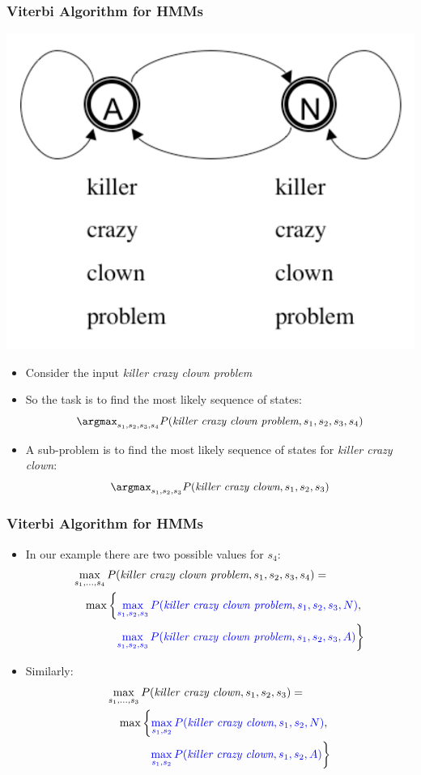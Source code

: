 \begin{frame}
\frametitle{Viterbi Algorithm for HMMs}
\begin{center}
\includegraphics[scale=.3]{figures/hmmfig}
\end{center}
\begin{itemize}[<+->]
\item Consider the input {\it killer crazy clown problem}
\item So the task is to find the most likely sequence of states:
\[ \argmax_{s_1, s_2, s_3, s_4} P(\textit{killer crazy clown problem}, s_1, s_2, s_3, s_4) \]
\item A sub-problem is to find the most likely sequence of states for {\it killer crazy clown}:
\[ \argmax_{s_1, s_2, s_3} P(\textit{killer crazy clown}, s_1, s_2, s_3) \]
\end{itemize}
\end{frame}

\begin{frame}
\frametitle{Viterbi Algorithm for HMMs}
\begin{itemize}[<+->]
\item In our example there are two possible values for $s_4$:
\begin{eqnarray*}
\lefteqn{\max_{s_1, \ldots, s_4} P(\textit{killer crazy clown problem}, s_1, s_2, s_3, s_4) =} \\
&& \max \left\{ {\color{blue} \max_{s_1, s_2, s_3} P(\textit{killer crazy clown problem}, s_1, s_2, s_3, N) }, \right. \\
&&  \left. {\color{blue} \max_{s_1, s_2, s_3} P(\textit{killer crazy clown problem}, s_1, s_2, s_3, A) } \right\}
\end{eqnarray*}
\item Similarly:
\begin{eqnarray*}
\lefteqn{\max_{s_1, \ldots, s_3} P(\textit{killer crazy clown}, s_1, s_2, s_3) =} \\
&& \max \left\{ {\color{blue} \max_{s_1, s_2} P(\textit{killer crazy clown}, s_1, s_2, N) }, \right. \\
&&  \left. {\color{blue} \max_{s_1, s_2} P(\textit{killer crazy clown}, s_1, s_2, A) } \right\}
\end{eqnarray*}
\end{itemize}
\end{frame}

